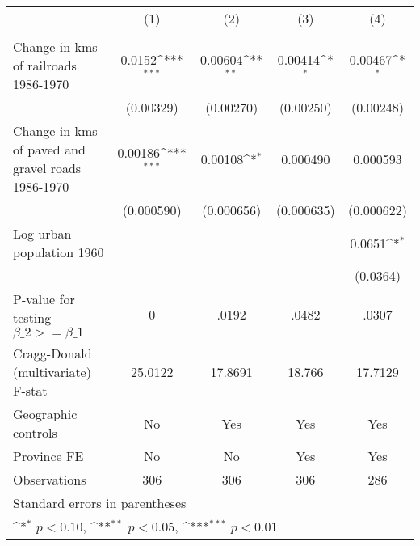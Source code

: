 {
\def\sym#1{\ifmmode^{#1}\else\(^{#1}\)\fi}
\begin{tabular}{l*{4}{c}}
\hline\hline
                &\multicolumn{1}{c}{(1)}&\multicolumn{1}{c}{(2)}&\multicolumn{1}{c}{(3)}&\multicolumn{1}{c}{(4)}\\
                &\multicolumn{1}{c}{}&\multicolumn{1}{c}{}&\multicolumn{1}{c}{}&\multicolumn{1}{c}{}\\
\hline
Change in kms of railroads 1986-1970&   0.0152\sym{***}&  0.00604\sym{**} &  0.00414\sym{*}  &  0.00467\sym{*}  \\
                &(0.00329)         &(0.00270)         &(0.00250)         &(0.00248)         \\
[1em]
Change in kms of paved and gravel roads 1986-1970&  0.00186\sym{***}&  0.00108\sym{*}  & 0.000490         & 0.000593         \\
                &(0.000590)         &(0.000656)         &(0.000635)         &(0.000622)         \\
[1em]
Log urban population 1960&                  &                  &                  &   0.0651\sym{*}  \\
                &                  &                  &                  & (0.0364)         \\
\hline
P-value for testing $\beta\_{2} >= \beta\_{1}$&        0         &    .0192         &    .0482         &    .0307         \\
Cragg-Donald (multivariate) F-stat&  25.0122         &  17.8691         &   18.766         &  17.7129         \\
Geographic controls&       No         &      Yes         &      Yes         &      Yes         \\
Province FE     &       No         &       No         &      Yes         &      Yes         \\
Observations    &      306         &      306         &      306         &      286         \\
\hline\hline
\multicolumn{5}{l}{\footnotesize Standard errors in parentheses}\\
\multicolumn{5}{l}{\footnotesize \sym{*} \(p<0.10\), \sym{**} \(p<0.05\), \sym{***} \(p<0.01\)}\\
\end{tabular}
}
